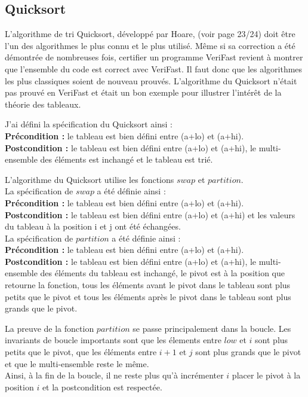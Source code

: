 \documentclass[11pt,openany]{article}
\newcommand{\verifast}{VeriFast}
\begin{document}
	\subsection{Quicksort}
		L'algorithme de tri Quicksort, d\'evelopp\'e par Hoare, (voir page 23/24) doit \^etre l'un des algorithmes le plus connu et le plus utilis\'e. M\^eme si sa correction a \'et\'e d\'emontr\'ee de nombreuses fois, certifier un programme \verifast{} revient \`a montrer que l'ensemble du code est correct avec \verifast. Il faut donc que les algorithmes les plus classiques soient de nouveau prouv\'es. L'algorithme du Quicksort n'\'etait pas prouv\'e en \verifast{} et \'etait un bon exemple pour illustrer l'int\'er\^et de la th\'eorie des tableaux. 
		
		J'ai d\'efini la sp\'ecification du Quicksort ainsi :\\
		\textbf{Pr\'econdition :} le tableau est bien d\'efini entre (a+lo) et (a+hi).\\
		\textbf{Postcondition :} le tableau est bien d\'efini entre (a+lo) et (a+hi), le multi-ensemble des \'el\'ements est inchang\'e et le tableau est tri\'e.
		
		L'algorithme du Quicksort utilise les fonctions $swap$ et $partition$.\\ La sp\'ecification de $swap$ a \'et\'e d\'efinie ainsi :\\
		\textbf{Pr\'econdition :} le tableau est bien d\'efini entre (a+lo) et (a+hi).\\
		\textbf{Postcondition :} le tableau est bien d\'efini entre (a+lo) et (a+hi) et les valeurs du tableau \`a la position i et j ont \'et\'e \'echang\'ees. \\
La sp\'ecification de $partition$ a \'et\'e d\'efinie ainsi :\\
		\textbf{Pr\'econdition :} le tableau est bien d\'efini entre (a+lo) et (a+hi).\\
		\textbf{Postcondition :} le tableau est bien d\'efini entre (a+lo) et (a+hi), le multi-ensemble des \'el\'ements du tableau est inchang\'e, le pivot est \`a la position que retourne la fonction, tous les \'el\'ements avant le pivot dans le tableau sont plus petits que le pivot et tous les \'el\'ements apr\`es le pivot dans le tableau sont plus grands que le pivot.
		
		La preuve de la fonction $partition$ se passe principalement dans la boucle. Les invariants de boucle importants sont que les \'elements entre $low$ et $i$ sont plus petits que le pivot, que les \'el\'ements entre $i+1$ et $j$ sont plus grands que le pivot et que le multi-ensemble reste le m\^eme.\\
		Ainsi, \`a la fin de la boucle, il ne reste plus qu'\`a incr\'ementer $i$ placer le pivot \`a la position $i$ et la postcondition est respect\'ee.
		
\end{document}

